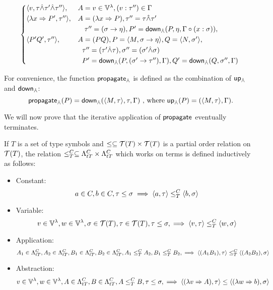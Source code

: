 \documentclass[main.tex]{subfiles}
\begin{document}
\begin{defn}
\[\begin{cases*}
            \ttt{v}{\tau \unify \tau' \unify \tau''}
 ,& $A = v \in \lvars, (v : \tau'') \in \Gamma$ \\
            \ttt{\lambda x \abstr P'}{\tau''}
 ,& $A = (\lambda x \abstr P), \tau'' = \tau \unify \tau'$ \\
                \phantom{} &\phantom{, } $\tau'' = (\sigma \tot \eta), P' = \mcf{down}_{\unify}(P, \eta, \Gamma \circ (x : \sigma)),$ \\
            \ttt{P' Q'}{\tau''}
 ,& $A = (PQ), P = \ttt{M}{\sigma \tot \eta}, Q = \ttt{N}{\sigma'},$ \\
                \phantom{} &\phantom{, }$\tau'' = (\tau' \unify \tau), \sigma'' = (\sigma' \unify \sigma)$ \\
                \phantom{} &\phantom{, }$P' = \mcf{down}_{\unify}(P, (\sigma' \tot \tau''), \Gamma),
                Q' = \mcf{down}_{\unify}(Q, \sigma'', \Gamma)$ \\
        \end{cases*}
    \]

    For convenience, the function $\mcf{propagate}_{\unify}$ is defined as the combination
    of $\mcf{up}_{\unify}$ and $\mcf{down}_{\unify}$:
    \[
        \mcf{propagate}_{\unify}(P) = \mcf{down}_{\unify}(\ttt{M}{\tau}, \tau, \Gamma)
        \text{ , where } \mcf{up}_{\unify}(P) = (\ttt{M}{\tau}, \Gamma).
    \]
\end{defn}

We will now prove that the iterative application of $\mcf{propagate}$
eventually terminates.

\begin{defn}
    If $T$ is a set of type symbols and $\less \subseteq \tclos{T} \times \tclos{T}$
    is a partial order relation on $\tclos{T}$, the relation
    $\termless{T}{C} \subseteq \ttlambda{T}{C} \times \ttlambda{T}{C}$
    which works on terms is defined inductively as follows:

    \begin{itemize}
        \item Constant:
            \[ a \in C, b \in C, \tau \less \sigma
                \implies \ttt{a}{\tau} \termless{T}{C} \ttt{b}{\sigma} \]
        \item Variable:
            \[ v \in \lvars, w \in \lvars, \sigma \in \tclos{T}, \tau \in \tclos{T},
                \tau \less \sigma,
                \implies \ttt{v}{\tau} \termless{T}{C} \ttt{w}{\sigma} \]
        \item Application:
            \[
                A_1 \in \ttlambda{T}{C}, A_2 \in \ttlambda{T}{C},
                B_1 \in \ttlambda{T}{C}, B_2 \in \ttlambda{T}{C},
                A_1 \termless{T}{C} A_2, B_1 \termless{T}{C} B_2,
                \implies \ttt{(A_1 B_1)}{\tau} \termless{T}{C} \ttt{(A_2 B_2)}{\sigma}
            \]
        \item Abstraction:
            \[ v \in \lvars, w \in \lvars, A \in \ttlambda{T}{C}, B \in \ttlambda{T}{C},
                A \termless{T}{C} B, \tau \less \sigma,
                \implies \ttt{(\lambda v \abstr A)}{\tau} \less \ttt{(\lambda w \abstr b)}{\sigma}\]
    \end{itemize}
\end{defn}
\end{document}
